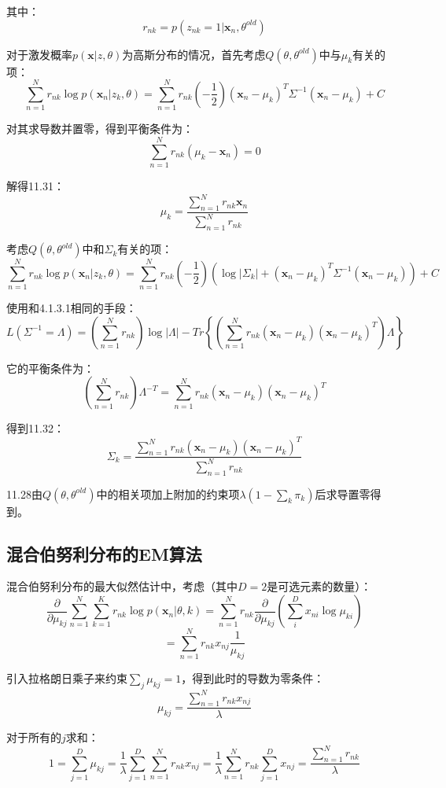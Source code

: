 \documentclass[UTF8]{ctexart}
\begin{document}
其中：
$$r_{nk}=p(z_{nk}=1|\textbf{x}_{n},\theta^{old})$$

对于激发概率$p(\textbf{x}|z,\theta)$为高斯分布的情况，首先考虑$Q(\theta,\theta^{old})$中与$\mu_{k}$有关的项：
$$\sum_{n=1}^{N}r_{nk} \log p(\textbf{x}_{n}|z_{k},\theta) = \sum_{n=1}^{N} r_{nk} (-\frac{1}{2})(\textbf{x}_{n}-\mu_{k})^{T}\Sigma^{-1}(\textbf{x}_{n}-\mu_{k}) + C$$

对其求导数并置零，得到平衡条件为：
$$\sum_{n=1}^{N}r_{nk}(\mu_{k}-\textbf{x}_{n})=0$$

解得11.31：
$$\mu_{k} =\frac{\sum_{n=1}^{N}r_{nk}\textbf{x}_{n}}{\sum_{n=1}^{N}r_{nk}}$$

考虑$Q(\theta,\theta^{old})$中和$\Sigma_{k}$有关的项：
$$\sum_{n=1}^{N}r_{nk}\log p(\textbf{x}_{n}|z_{k},\theta) = \sum_{n=1}^{N}r_{nk} (-\frac{1}{2})(\log |\Sigma_{k}|+(\textbf{x}_{n}-\mu_{k})^{T}\Sigma^{-1}(\textbf{x}_{n}-\mu_{k})) + C$$

使用和4.1.3.1相同的手段：
$$L(\Sigma^{-1}=\Lambda)=(\sum_{n=1}^{N}r_{nk})\log |\Lambda|-Tr\left\{ (\sum_{n=1}^{N}r_{nk}(\textbf{x}_{n}-\mu_{k})(\textbf{x}_{n}-\mu_{k})^{T}) \Lambda \right\}$$

它的平衡条件为：
$$(\sum_{n=1}^{N}r_{nk})\Lambda^{-T}=\sum_{n=1}^{N}r_{nk}(\textbf{x}_{n}-\mu_{k})(\textbf{x}_{n}-\mu_{k})^{T}$$

得到11.32：
$$\Sigma_{k} = \frac{\sum_{n=1}^{N}r_{nk}(\textbf{x}_{n}-\mu_{k})(\textbf{x}_{n}-\mu_{k})^{T}}{\sum_{n=1}^{N}r_{nk}}$$

11.28由$Q(\theta,\theta^{old})$中的相关项加上附加的约束项$\lambda(1-\sum_{k}\pi_{k})$后求导置零得到。

\subsection{混合伯努利分布的EM算法}
混合伯努利分布的最大似然估计中，考虑（其中$D=2$是可选元素的数量）：
$$\frac{\partial}{\partial \mu_{kj}}\sum_{n=1}^{N}\sum_{k=1}^{K}r_{nk}\log p(\textbf{x}_{n}|\theta,k)=\sum_{n=1}^{N}r_{nk}\frac{\partial}{\partial \mu_{kj}}(\sum_{i}^{D}x_{ni}\log \mu_{ki})$$
$$=\sum_{n=1}^{N}r_{nk}x_{nj}\frac{1}{\mu_{kj}}$$

引入拉格朗日乘子来约束$\sum_{j}\mu_{kj}=1$，得到此时的导数为零条件：
$$\mu_{kj}=\frac{\sum_{n=1}^{N}r_{nk}x_{nj}}{\lambda}$$

对于所有的$j$求和：
$$1=\sum_{j=1}^{D}\mu_{kj} = \frac{1}{\lambda}\sum_{j=1}^{D}\sum_{n=1}^{N}r_{nk}x_{nj}=\frac{1}{\lambda}\sum_{n=1}^{N}r_{nk}\sum_{j=1}^{D}x_{nj}=\frac{\sum_{n=1}^{N}r_{nk}}{\lambda}$$
\end{document}
